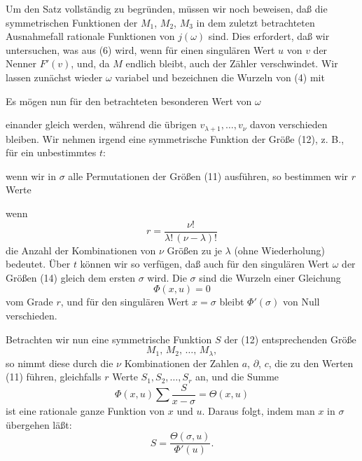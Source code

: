 
Um den Satz vollständig zu begründen, müssen wir noch beweisen, daß die symmetrischen Funktionen der $M_1$, $M_2$, $M_3$ in
dem zuletzt betrachteten Ausnahmefall rationale Funktionen von
$j(\omega)$ sind. Dies erfordert, daß wir untersuchen, was aus (6) wird,
wenn für einen singulären Wert $u$ von $v$ der Nenner $F'(v)$, und,
da $M$ endlich bleibt, auch der Zähler verschwindet. Wir lassen
zunächst wieder $\omega$ variabel und bezeichnen die Wurzeln von
(4) mit

Es mögen nun für den betrachteten besonderen Wert von $\omega$

einander gleich werden, während die übrigen $v_{\lambda+1}, \ldots, v_\nu$ davon
verschieden bleiben. Wir nehmen irgend eine symmetrische Funktion der Größe (12), z. B., für ein unbestimmtes $t$:

wenn wir in $\sigma$ alle Permutationen der Größen (11) ausführen, so
bestimmen wir $r$ Werte

wenn
\[
r = \frac{\nu!}{\lambda!\,(\nu - \lambda)!}
\]
die Anzahl der Kombinationen von $\nu$ Größen zu je $\lambda$ (ohne Wiederholung) bedeutet. Über $t$ können wir so verfügen, daß auch für
den singulären Wert $\omega$  der Größen (14) gleich dem
ersten $\sigma$ wird. Die $\sigma$ sind die Wurzeln einer Gleichung
\[
\Phi(x, u) = 0
\]
vom Grade $r$, und für den singulären Wert $x = \sigma$ bleibt $\Phi'(\sigma)$
von Null verschieden.

Betrachten wir nun eine symmetrische Funktion $S$ der (12)
entsprechenden Größe
\[
M_1,\, M_2,\, \ldots,\, M_\lambda,
\]
so nimmt diese durch die $\nu$ Kombinationen der Zahlen $a$, $\partial$, $c$, die
zu den Werten (11) führen, gleichfalls $r$ Werte $S_1, S_2, \ldots, S_r$ an,
und die Summe
\[
\Phi(x, u) \sum \frac{S}{x - \sigma} = \Theta(x, u)
\]
ist eine rationale ganze Funktion von $x$ und $u$. Daraus folgt,
indem man $x$ in $\sigma$ übergehen läßt:
\[
S = \frac{\Theta(\sigma, u)}{\Phi'(u)}.
\]
